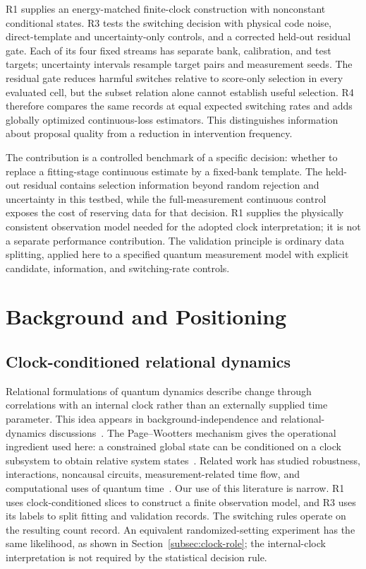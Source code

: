 \documentclass{iopjournal}
\begin{document}
R1 supplies an energy-matched finite-clock construction with nonconstant
conditional states.  R3 tests the switching decision with physical code noise,
direct-template and uncertainty-only controls, and a corrected held-out
residual gate.  Each of its four fixed streams has separate bank, calibration,
and test targets; uncertainty intervals resample target pairs and measurement
seeds.  The residual gate reduces harmful switches relative to score-only
selection in every evaluated cell, but the subset relation alone cannot
establish useful selection.  R4 therefore compares the same records at equal
expected switching rates and adds globally optimized continuous-loss
estimators.  This distinguishes information about proposal quality from a
reduction in intervention frequency.

The contribution is a controlled benchmark of a specific decision: whether
to replace a fitting-stage continuous estimate by a fixed-bank template.
The held-out residual contains selection information beyond random rejection
and uncertainty in this testbed, while the full-measurement continuous control
exposes the cost of reserving data for that decision.  R1 supplies the
physically consistent observation model needed for the adopted clock
interpretation; it is not a separate performance contribution.
The validation principle is ordinary data splitting, applied here to a
specified quantum measurement model with explicit candidate, information,
and switching-rate controls.

\section{Background and Positioning}
\subsection{Clock-conditioned relational dynamics}

Relational formulations of quantum dynamics describe change through correlations
with an internal clock rather than an externally supplied time parameter. This
idea appears in background-independence and relational-dynamics
discussions~\cite{Smolin2005BackgroundIndependence,Rovelli2007QuantumGravity}.
The Page--Wootters mechanism gives the operational ingredient used here: a
constrained global state can be conditioned on a clock subsystem to obtain
relative system states~\cite{Giovannetti2015QuantumTime,Marletto2017EvolutionWithoutEvolution,Hoehn2021TrinityRelationalQuantumDynamics}.
Related work has studied robustness, interactions, noncausal circuits,
measurement-related time flow, and computational uses of quantum
time~\cite{Rijavec2023RobustnessPageWootters,Mendes2021NonlinearPageWootters,Baumann2022NoncausalPageWoottersCircuits,Paiva2022FlowTimeEnergyMeasurements,Diaz2025ParallelPageWoottersSimulation}.
Our use of this literature is narrow.  R1 uses clock-conditioned slices to
construct a finite observation model, and R3 uses its labels to split fitting
and validation records.  The switching rules operate on the resulting count
record.  An equivalent randomized-setting experiment has the same likelihood,
as shown in Section~\ref{subsec:clock-role}; the internal-clock interpretation
is not required by the statistical decision rule.
\end{document}
